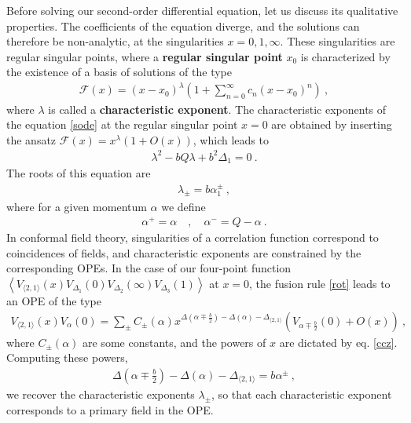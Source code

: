 \documentclass[12pt,a4paper,notitlepage]{report}
\numberwithin{equation}{section}
\theoremstyle{break}
\begin{document}
Before solving our second-order differential equation, let us discuss its qualitative properties.
The coefficients of the equation diverge, and the solutions can therefore be non-analytic, at the singularities $x=0,1,\infty$.
These singularities are regular singular points, where a \textbf{regular singular point} $x_0$ is characterized by the existence of a basis of solutions of the type  
\begin{align}
 \mathcal{F}(x)=(x-x_0)^\lambda\left(1+\sum_{n=0}^\infty c_n (x-x_0)^n\right)\ ,
\label{zxl}
\end{align}
where $\lambda$ is called a \textbf{\boldmath characteristic exponent}.
The characteristic exponents of the equation \eqref{sode} at the regular singular point $x=0$ are obtained by inserting the ansatz $\mathcal{F}(x) = x^\lambda(1+O(x))$, which leads to 
\begin{align}
 \lambda^2 - bQ\lambda + b^2 \Delta_1 = 0 \ .
\end{align}
The roots of this equation are 
\begin{align}
 \lambda_\pm = b\alpha_1^\pm \ , 
\label{lpm}
\end{align}
where for a given momentum $\alpha$ we define 
\begin{align}
 \alpha^+ = \alpha \quad , \quad \alpha^- = Q-\alpha\ .
\label{apm}
\end{align}
In conformal field theory, singularities of a correlation function correspond to coincidences of fields, and characteristic exponents are constrained by the corresponding OPEs.
In the case of our four-point function $\left\langle V_{\langle 2,1 \rangle}(x)V_{\Delta_1}(0)V_{\Delta_2}(\infty)V_{\Delta_3}(1)\right\rangle$ at $x=0$, the fusion rule \eqref{rot} leads to an OPE of the type
\begin{align}
 V_{\langle 2,1 \rangle}(x)V_{\alpha}(0) = \sum_\pm C_\pm(\alpha) x^{\Delta\left(\alpha\mp \frac{b}{2}\right) -\Delta(\alpha) - \Delta_{\langle 2,1 \rangle}} \left(V_{\alpha\mp\frac{b}{2}}(0) + O(x)\right)\ ,
\end{align}
where $C_\pm(\alpha)$ are some constants, and the powers of $x$ are dictated by eq. \eqref{ccz}. 
Computing these powers,
\begin{align}
 \Delta\left(\alpha\mp \frac{b}{2}\right) -\Delta(\alpha) - \Delta_{\langle 2,1 \rangle}  = b \alpha^{\pm}\ ,
\end{align}
we recover the characteristic exponents $\lambda_\pm$, so that each characteristic exponent corresponds to a primary field in the OPE.
\end{document}
